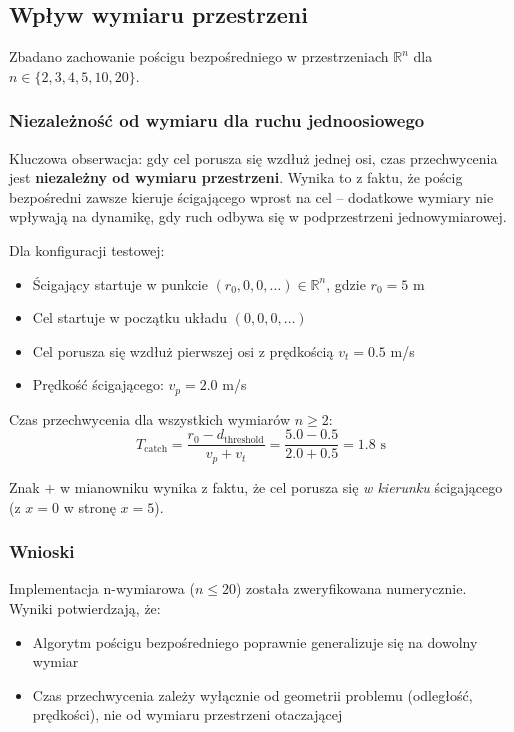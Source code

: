 \documentclass[12pt,a4paper]{article}
\begin{document}
\subsection{Wpływ wymiaru przestrzeni}

Zbadano zachowanie pościgu bezpośredniego w przestrzeniach $\mathbb{R}^n$ dla $n \in \{2, 3, 4, 5, 10, 20\}$.

\subsubsection{Niezależność od wymiaru dla ruchu jednoosiowego}

Kluczowa obserwacja: gdy cel porusza się wzdłuż jednej osi, czas przechwycenia jest \textbf{niezależny od wymiaru przestrzeni}. Wynika to z faktu, że pościg bezpośredni zawsze kieruje ścigającego wprost na cel -- dodatkowe wymiary nie wpływają na dynamikę, gdy ruch odbywa się w podprzestrzeni jednowymiarowej.

Dla konfiguracji testowej:
\begin{itemize}
    \item Ścigający startuje w punkcie $(r_0, 0, 0, \ldots) \in \mathbb{R}^n$, gdzie $r_0 = 5$ m
    \item Cel startuje w początku układu $(0, 0, 0, \ldots)$
    \item Cel porusza się wzdłuż pierwszej osi z prędkością $v_t = 0.5$ m/s
    \item Prędkość ścigającego: $v_p = 2.0$ m/s
\end{itemize}

Czas przechwycenia dla wszystkich wymiarów $n \geq 2$:
\begin{equation}
T_{\text{catch}} = \frac{r_0 - d_{\text{threshold}}}{v_p + v_t} = \frac{5.0 - 0.5}{2.0 + 0.5} = 1.8 \text{ s}
\end{equation}

Znak $+$ w mianowniku wynika z faktu, że cel porusza się \textit{w kierunku} ścigającego (z $x=0$ w stronę $x=5$).

\subsubsection{Wnioski}

Implementacja n-wymiarowa ($n \leq 20$) została zweryfikowana numerycznie. Wyniki potwierdzają, że:
\begin{itemize}
    \item Algorytm pościgu bezpośredniego poprawnie generalizuje się na dowolny wymiar
    \item Czas przechwycenia zależy wyłącznie od geometrii problemu (odległość, prędkości), nie od wymiaru przestrzeni otaczającej
\end{itemize}
\end{document}
